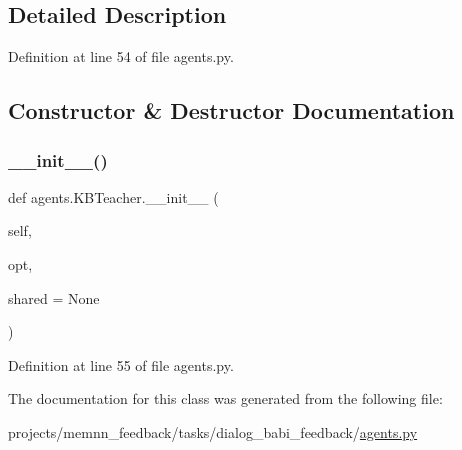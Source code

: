 \subsection{Detailed Description}


Definition at line 54 of file agents.\+py.



\subsection{Constructor \& Destructor Documentation}
\mbox{\label{classagents_1_1KBTeacher_af79ee04a7b32d7fc4fa41149bcc6f686}} 
\subsubsection{\texorpdfstring{\+\_\+\+\_\+init\+\_\+\+\_\+()}{\_\_init\_\_()}}
{\footnotesize\ttfamily def agents.\+K\+B\+Teacher.\+\_\+\+\_\+init\+\_\+\+\_\+ (\begin{DoxyParamCaption}\item[{}]{self,  }\item[{}]{opt,  }\item[{}]{shared = {\ttfamily None} }\end{DoxyParamCaption})}



Definition at line 55 of file agents.\+py.



The documentation for this class was generated from the following file\+:\begin{DoxyCompactItemize}
\item 
projects/memnn\+\_\+feedback/tasks/dialog\+\_\+babi\+\_\+feedback/\hyperlink{projects_2memnn__feedback_2tasks_2dialog__babi__feedback_2agents_8py}{agents.\+py}\end{DoxyCompactItemize}
